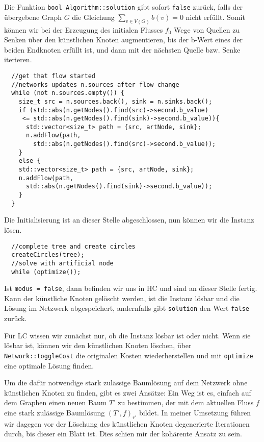 Die Funktion \lstinline|bool Algorithm::solution| gibt sofort \lstinline|false| zurück, falls der übergebene Graph $G$ die Gleichung $\sum_{v\in V(G)} b(v)=0$ nicht erfüllt. Somit können wir bei der Erzeugung des initialen Flusses $f_0$ Wege von Quellen zu Senken über den künstlichen Knoten augmentieren, bis der b-Wert eines der beiden Endknoten erfüllt ist, und dann mit der nächsten Quelle bzw. Senke iterieren.

\begin{lstlisting}
  //get that flow started
  //networks updates n.sources after flow change
  while (not n.sources.empty()) {
    size_t src = n.sources.back(), sink = n.sinks.back();
    if (std::abs(n.getNodes().find(src)->second.b_value)
     <= std::abs(n.getNodes().find(sink)->second.b_value)){
      std::vector<size_t> path = {src, artNode, sink};
      n.addFlow(path,
        std::abs(n.getNodes().find(src)->second.b_value));
    }
    else {
    std::vector<size_t> path = {src, artNode, sink};
    n.addFlow(path,
      std::abs(n.getNodes().find(sink)->second.b_value));
    }
  }
\end{lstlisting}

Die Initialisierung ist an dieser Stelle abgeschlossen, nun können wir die Instanz lösen.

\begin{lstlisting}
  //complete tree and create circles
  createCircles(tree);
  //solve with artificial node
  while (optimize());
\end{lstlisting}

Ist \lstinline|modus = false|, dann befinden wir uns in HC und sind an dieser Stelle fertig. Kann der künstliche Knoten gelöscht werden, ist die Instanz lösbar und die Lösung im Netzwerk abgespeichert, andernfalls gibt \lstinline|solution| den Wert \lstinline|false| zurück.

Für LC wissen wir zunächst nur, ob die Instanz lösbar ist oder nicht. Wenn sie lösbar ist, können wir den künstlichen Knoten löschen, über \lstinline|Network::toggleCost| die originalen Kosten wiederherstellen und mit \lstinline|optimize| eine optimale Lösung finden.

Um die dafür notwendige stark zulässige Baumlösung auf dem Netzwerk ohne künstlichen Knoten zu finden, gibt es zwei Ansätze: Ein Weg ist es, einfach auf dem Graphen einen neuen Baum $T'$ zu bestimmen, der mit dem aktuellen Fluss $f$ eine stark zulässige Baumlösung $(T',f)_{r'}$ bildet. In meiner Umsetzung führen wir dagegen vor der Löschung des künstlichen Knoten degenerierte Iterationen durch, bis dieser ein Blatt ist. Dies schien mir der kohärente Ansatz zu sein.

